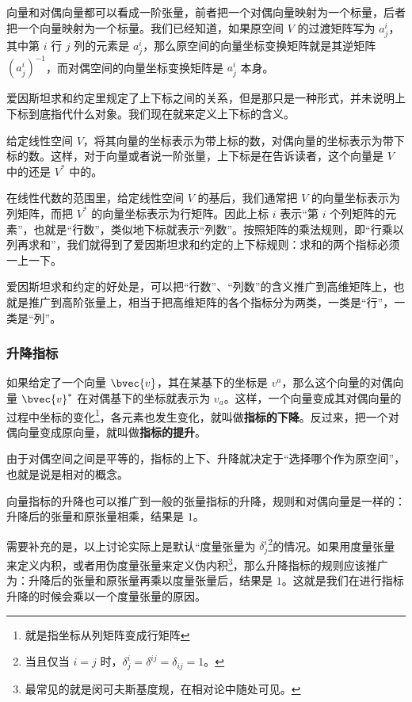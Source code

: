 向量和对偶向量都可以看成一阶张量，前者把一个对偶向量映射为一个标量，后者把一个向量映射为一个标量。我们已经知道，如果原空间 $V$ 的过渡矩阵写为 $a^i_j$，其中第 $i$ 行 $j$ 列的元素是 $a^i_j$，那么原空间的向量坐标变换矩阵就是其逆矩阵 $(a^i_j)^{-1}$，而对偶空间的向量坐标变换矩阵是 $a^i_j$ 本身。

爱因斯坦求和约定里规定了上下标之间的关系，但是那只是一种形式，并未说明上下标到底指代什么对象。我们现在就来定义上下标的含义。

\begin{definition}{}
给定线性空间 $V$，将其向量的坐标表示为带上标的数，对偶向量的坐标表示为带下标的数。这样，对于向量或者说一阶张量，上下标是在告诉读者，这个向量是 $V$ 中的还是 $V^*$ 中的。
\end{definition}

在线性代数的范围里，给定线性空间 $V$ 的基后，我们通常把 $V$ 的向量坐标表示为列矩阵，而把 $V^*$ 的向量坐标表示为行矩阵。因此上标 $i$ 表示“第 $i$ 个列矩阵的元素”，也就是“行数”，类似地下标就表示“列数”。按照矩阵的乘法规则，即“行乘以列再求和”，我们就得到了爱因斯坦求和约定的上下标规则：求和的两个指标必须一上一下。

爱因斯坦求和约定的好处是，可以把“行数”、“列数”的含义推广到高维矩阵上，也就是推广到高阶张量上，相当于把高维矩阵的各个指标分为两类，一类是“行”，一类是“列”。

\subsubsection{升降指标}

如果给定了一个向量 $\bvec{v}$，其在某基下的坐标是 $v^a$，那么这个向量的对偶向量 $\bvec{v}^*$ 在对偶基下的坐标就表示为 $v_a$。这样，一个向量变成其对偶向量的过程中坐标的变化\footnote{就是指坐标从列矩阵变成行矩阵}，各元素也发生变化，就叫做\textbf{指标的下降}。反过来，把一个对偶向量变成原向量，就叫做\textbf{指标的提升}。

由于对偶空间之间是平等的，指标的上下、升降就决定于“选择哪个作为原空间”，也就是说是相对的概念。

向量指标的升降也可以推广到一般的张量指标的升降，规则和对偶向量是一样的：升降后的张量和原张量相乘，结果是 $1$。

需要补充的是，以上讨论实际上是默认“度量张量为 $\delta^i_j$\footnote{当且仅当 $i=j$ 时，$\delta^i_j=\delta^{ij}=\delta_{ij}=1$。}的情况。如果用度量张量来定义内积，或者用伪度量张量来定义伪内积\footnote{最常见的就是闵可夫斯基度规，在相对论中随处可见。}，那么升降指标的规则应该推广为：升降后的张量和原张量再乘以度量张量后，结果是 $1$。这就是我们在进行指标升降的时候会乘以一个度量张量的原因。

